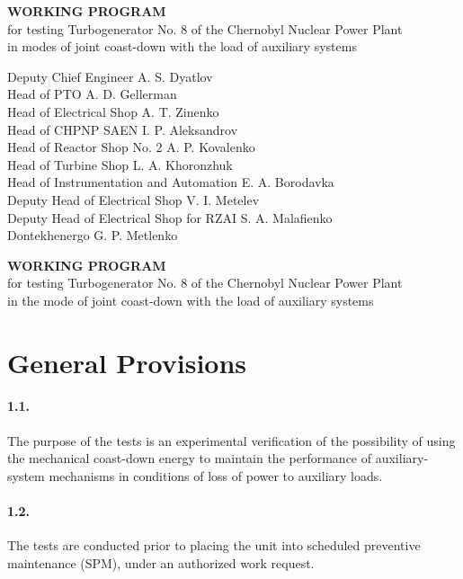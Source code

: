 \documentclass[openright]{bookest}
\begin{document}
\begin{center}
\textbf{WORKING PROGRAM} \\
for testing Turbogenerator No. 8 of the Chernobyl Nuclear Power Plant \\
in modes of joint coast-down with the load of auxiliary systems
\end{center}

\noindent
Deputy Chief Engineer \hfill A. S. Dyatlov \\
Head of PTO \hfill A. D. Gellerman \\
Head of Electrical Shop \hfill A. T. Zinenko \\
Head of CHPNP SAEN \hfill I. P. Aleksandrov \\
Head of Reactor Shop No. 2 \hfill A. P. Kovalenko \\
Head of Turbine Shop \hfill L. A. Khoronzhuk \\
Head of Instrumentation and Automation \hfill E. A. Borodavka \\
Deputy Head of Electrical Shop \hfill V. I. Metelev \\
Deputy Head of Electrical Shop for RZAI \hfill S. A. Malafienko \\
Dontekhenergo \hfill G. P. Metlenko

\medskip

\begin{center}
\textbf{WORKING PROGRAM} \\
for testing Turbogenerator No. 8 of the Chernobyl Nuclear Power Plant \\  
in the mode of joint coast-down with the load of auxiliary systems
\end{center}

\section*{General Provisions}

\paragraph{1.1.} The purpose of the tests is an experimental verification of the possibility of using the mechanical coast-down energy to maintain the performance of auxiliary-system mechanisms in conditions of loss of power to auxiliary loads.

\paragraph{1.2.} The tests are conducted prior to placing the unit into scheduled preventive maintenance (SPM), under an authorized work request.
\end{document}
